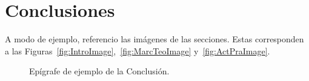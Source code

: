   \section{Conclusiones}
    A modo de ejemplo, referencio las imágenes de las secciones. Estas corresponden a las 
    Figuras~\ref{fig:IntroImage},~\ref{fig:MarcTeoImage} y~\ref{fig:ActPraImage}.
   
    \begin{figure}[ht]
      \centering
      \caption{Epígrafe de ejemplo de la Conclusión.}
      \label{fig:ConclImage}
    \end{figure}

